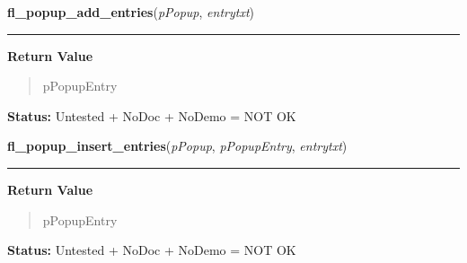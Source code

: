 \hspace{.8\funcindent}\begin{boxedminipage}{\funcwidth}

    \raggedright \textbf{fl\_popup\_add\_entries}(\textit{pPopup}, \textit{entrytxt})

    \vspace{-1.5ex}

    \rule{\textwidth}{0.5\fboxrule}
\setlength{\parskip}{2ex}
\setlength{\parskip}{1ex}
      \textbf{Return Value}
    \vspace{-1ex}

      \begin{quote}
      pPopupEntry

      \end{quote}

\textbf{Status:} Untested + NoDoc + NoDemo = NOT OK



    \end{boxedminipage}

    \label{xformslib:flpopup:fl_popup_insert_entries}

    \vspace{0.5ex}

\hspace{.8\funcindent}\begin{boxedminipage}{\funcwidth}

    \raggedright \textbf{fl\_popup\_insert\_entries}(\textit{pPopup}, \textit{pPopupEntry}, \textit{entrytxt})

    \vspace{-1.5ex}

    \rule{\textwidth}{0.5\fboxrule}
\setlength{\parskip}{2ex}
\setlength{\parskip}{1ex}
      \textbf{Return Value}
    \vspace{-1ex}

      \begin{quote}
      pPopupEntry

      \end{quote}

\textbf{Status:} Untested + NoDoc + NoDemo = NOT OK



    \end{boxedminipage}

    \label{xformslib:flpopup:fl_popup_create}

